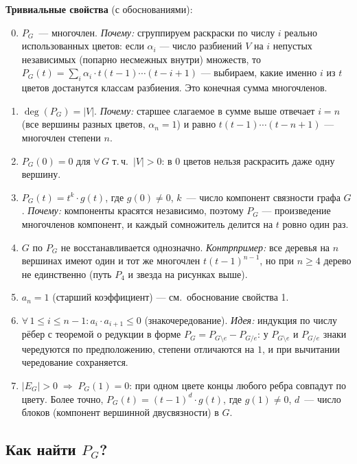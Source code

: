 \medskip
\textbf{Тривиальные свойства} (с обоснованиями):
\begin{enumerate}[label=\arabic*)]
  \setcounter{enumi}{-1}
  \item $P_G$~--- многочлен. \textit{Почему:} сгруппируем раскраски по
        числу $i$ реально использованных цветов: если $\alpha_i$ ---
        число разбиений $V$ на $i$ непустых независимых (попарно
        несмежных внутри) множеств, то
        $P_G(t) = \sum_{i} \alpha_i \cdot t(t-1)\cdots(t-i+1)$ ---
        выбираем, какие именно $i$ из $t$ цветов достанутся классам
        разбиения. Это конечная сумма многочленов.
  \item $\deg(P_G) = |V|$. \textit{Почему:} старшее слагаемое в сумме
        выше отвечает $i = n$ (все вершины разных цветов, $\alpha_n = 1$)
        и равно $t(t-1)\cdots(t-n+1)$ --- многочлен степени $n$.
  \item $P_G(0) = 0$ для $\forall\, G$ т.\,ч.\ $|V| > 0$:
        в $0$ цветов нельзя раскрасить даже одну вершину.
  \item $P_G(t) = t^k \cdot g(t)$, где $g(0) \neq 0$, $k$~--- число
        компонент связности графа $G$. \textit{Почему:} компоненты
        красятся независимо, поэтому $P_G$ --- произведение многочленов
        компонент, и каждый сомножитель делится на $t$ ровно один раз.
  \item $G$ по $P_G$ не восстанавливается однозначно.
        \textit{Контрпример:} все деревья на $n$ вершинах имеют один и
        тот же многочлен $t(t-1)^{n-1}$, но при $n \ge 4$ дерево не
        единственно (путь $P_4$ и звезда на рисунках выше).
  \item $a_n = 1$ (старший коэффициент) --- см.~обоснование свойства 1.
  \item $\forall\, 1 \leq i \leq n-1\colon a_i \cdot a_{i+1} \leq 0$
        (знакочередование). \textit{Идея:} индукция по числу рёбер с
        теоремой о редукции в форме
        $P_G = P_{G \setminus e} - P_{G/e}$: у $P_{G\setminus e}$
        и $P_{G/e}$ знаки чередуются по предположению, степени
        отличаются на $1$, и при вычитании чередование сохраняется.
  \item $|E_G| > 0 \;\Rightarrow\; P_G(1) = 0$: при одном цвете концы
        любого ребра совпадут по цвету. Более точно,
        $P_G(t) = (t-1)^d \cdot g(t)$, где $g(1) \neq 0$, $d$~--- число
        блоков (компонент вершинной двусвязности) в $G$.
\end{enumerate}

\subsection*{Как найти $P_G$?}

